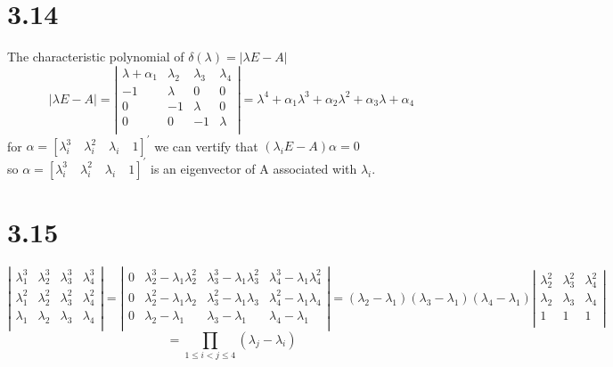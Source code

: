 \documentclass{article}
\begin{document}
\section*{3.14}
The characteristic polynomial of $\delta(\lambda)=|\lambda E-A|$
\[|\lambda E-A|=
\left|
\begin{array}{cccc}
\lambda+\alpha_1 & \lambda_2 &\lambda_3 & \lambda_4\\
-1 & \lambda & 0 & 0\\
0 & -1 & \lambda & 0\\
0 & 0 & -1 & \lambda\\
\end{array}\right|
=\lambda^4+\alpha_1\lambda^3+\alpha_2\lambda^2+\alpha_3\lambda+\alpha_4
\]
for $\alpha=[\lambda_i^3 \quad \lambda_i^2 \quad \lambda_i \quad 1]^{'}$
we can vertify that $(\lambda_iE-A)\alpha=0$\\
so $\alpha=[\lambda_i^3 \quad \lambda_i^2 \quad \lambda_i \quad 1]^{'} $ is an eigenvector of A associated with $\lambda_i$.

\section*{3.15}
\[
\left|
\begin{array}{cccc}
\lambda_1^3 & \lambda_2^3 & \lambda_3^3 & \lambda_4^3\\
\lambda_1^2 & \lambda_2^2 & \lambda_3^2 & \lambda_4^2\\
\lambda_1 & \lambda_2 & \lambda_3 & \lambda_4\\
\end{array}\right|
=
\left|
\begin{array}{cccc}
0 & \lambda_2^3-\lambda_1\lambda_2^2 & \lambda_3^3-\lambda_1\lambda_3^2 & \lambda_4^3-\lambda_1\lambda_4^2\\
0 & \lambda_2^2-\lambda_1\lambda_2 & \lambda_3^2-\lambda_1\lambda_3 & \lambda_4^2-\lambda_1\lambda_4\\
0 & \lambda_2-\lambda_1 & \lambda_3-\lambda_1 & \lambda_4-\lambda_1\\
\end{array}\right|
=(\lambda_2-\lambda_1)(\lambda_3-\lambda_1)(\lambda_4-\lambda_1)
\left|
\begin{array}{ccc}
\lambda_2^2 & \lambda_3^2 & \lambda_4^2\\
\lambda_2 & \lambda_3 & \lambda_4\\
1 & 1 &1\\
\end{array}
\right|
\]
\[=\prod \limits_{1 \leq i < j \leq 4}(\lambda_j-\lambda_i)\]
\end{document}
